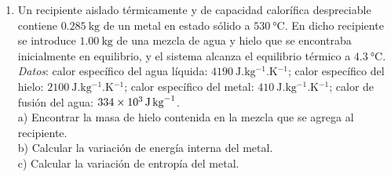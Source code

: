 \documentclass[a4paper,11pt,dvipsnames]{article}
\begin{document}
\begin{enumerate}[leftmargin=*]
  



  \item Un recipiente aislado térmicamente y de capacidad calorífica despreciable contiene $\SI{0.285}{\kilogram}$ de un metal en estado sólido a $\SI{530}{\celsius}$. En dicho recipiente se introduce $\SI{1.00}{\kilogram}$ de una mezcla de agua y hielo que se encontraba inicialmente en equilibrio, y el sistema alcanza el equilibrio térmico a $\SI{4.3}{\celsius}$. \textit{Datos}: calor específico del agua líquida: $\SI{4190}{\joule.\kilogram^{-1}.\kelvin^{-1}}$; calor específico del hielo: $\SI{2100}{\joule.\kilogram^{-1}.\kelvin^{-1}}$; calor específico del metal: $\SI{410}{\joule.\kilogram^{-1}.\kelvin^{-1}}$; calor de fusión del agua: $\SI{334E3}{\joule.\kilogram^{-1}}$.\\
  a) Encontrar la masa de hielo contenida en la mezcla que se agrega al recipiente.\\
  b) Calcular la variación de energía interna del metal.\\
  c) Calcular la variación de entropía del metal. 


\end{enumerate}
\end{document}

